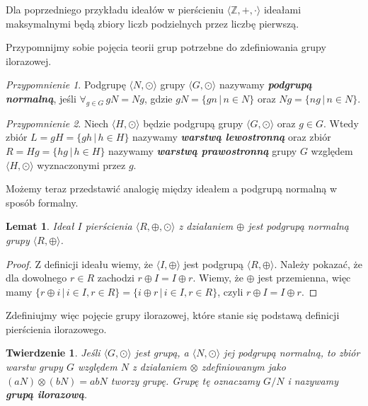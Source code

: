 \documentclass[declaration,shortabstract]{iithesis}
\theoremstyle{definition}
\theoremstyle{remark} \newtheorem{observation}{Obserwacja}
\theoremstyle{plain} \newtheorem{theorem}{Twierdzenie}
\theoremstyle{plain} \newtheorem{lemma}{Lemat}
\theoremstyle{remark} \newtheorem*{remark*}{Uwaga}
\theoremstyle{reminder} \newtheorem*{reminder*}{Przypomnienie}
\begin{document}
Dla poprzedniego przykładu ideałów w pierścieniu $\langle \mathbb{Z}, +, \cdot \rangle$ ideałami maksymalnymi będą zbiory liczb podzielnych przez liczbę pierwszą.

Przypomnijmy sobie pojęcia teorii grup potrzebne do zdefiniowania grupy ilorazowej.
\begin{reminder*}
	Podgrupę $\langle N, \odot \rangle$ grupy $\langle G, \odot \rangle$ nazywamy \textit{\textbf{podgrupą normalną}}, jeśli $\forall_{g \in G} \, gN = Ng$, gdzie $gN = \{gn \, | \, n \in N\}$ oraz $Ng = \{ng \, | \, n \in N\}$.
\end{reminder*}

\begin{reminder*}
	Niech $\langle H, \odot \rangle$ będzie podgrupą grupy $\langle G, \odot \rangle$ oraz $g \in G$. Wtedy zbiór 
	$L = gH = \{gh \, | \, h \in H\}$ nazywamy \textbf{\textit{warstwą lewostronną}} oraz zbiór $R = Hg = \{hg \, | \, h \in H\}$ nazywamy \textbf{\textit{warstwą prawostronną}} grupy $G$ względem $\langle H, \odot \rangle$ wyznaczonymi przez $g$.
\end{reminder*}

Możemy teraz przedstawić analogię między ideałem a podgrupą normalną w sposób formalny.

\begin{lemma}
	Ideał $I$ pierścienia $\langle R, \oplus, \odot \rangle$ z działaniem $\oplus$ jest podgrupą normalną grupy $\langle R, \oplus \rangle$.
\end{lemma}

\begin{proof}
	Z definicji ideału wiemy, że $\langle I, \oplus \rangle$ jest podgrupą $\langle R, \oplus \rangle$. \newline
	Należy pokazać, że dla dowolnego $r \in R$ zachodzi $r \oplus I = I \oplus r$. Wiemy, że $\oplus$ jest przemienna, więc mamy ${\{r \oplus i \, | \, i \in I, r \in R\}} = {\{i \oplus r \, | \, i \in I, r \in R\}}$, czyli $r \oplus I = I \oplus r$.
\end{proof}

Zdefiniujmy więc pojęcie grupy ilorazowej, które stanie się podstawą definicji pierścienia ilorazowego.

\theoremstyle{theorem}\label{grup_ilo}
\begin{theorem}
	Jeśli $\langle G, \odot \rangle$ jest grupą, a $\langle N, \odot \rangle$ jej podgrupą normalną, to zbiór warstw grupy $G$ względem $N$ z działaniem $\otimes$ zdefiniowanym jako $(aN)\otimes(bN) = abN$ tworzy grupę. Grupę tę oznaczamy $G/N$ i nazywamy \textbf{\textit{grupą ilorazową}}.
\end{theorem}
\end{document}
